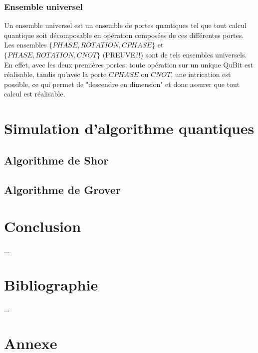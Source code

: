 \documentclass[a4paper,12pt]{report}
\newcommand{\para}[1]{\par{#1}\\}
\begin{document}
		\subsection{Ensemble universel}

\par{
	Un ensemble universel est un ensemble de portes quantiques tel que tout calcul quantique soit décomposable en opération composées de ces différentes portes. Les ensembles $\{PHASE,ROTATION,CPHASE\}$ et $\{PHASE,ROTATION,CNOT\}$ (PREUVE?!) sont de tels ensembles universels. En effet, avec les deux premières portes, toute opération sur un unique QuBit est réalisable, tandis qu'avec la porte $CPHASE$ ou $CNOT$, une intrication est possible, ce qui permet de "descendre en dimension" et donc assurer que tout calcul est réalisable.
}

\chapter{Simulation d'algorithme quantiques}
	\section{Algorithme de Shor}
	\section{Algorithme de Grover}

%

\chapter*{Conclusion}

\para{
	...
}

\chapter*{Bibliographie}

\para{
	...
}


\chapter*{Annexe}
\end{document}
